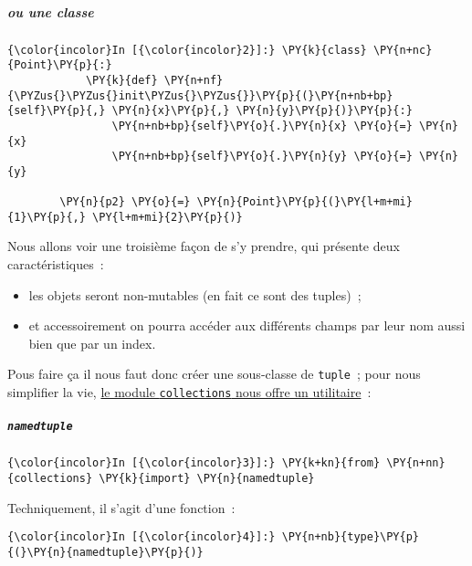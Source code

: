     \hypertarget{ou-une-classe}{%
\subparagraph{ou une classe}\label{ou-une-classe}}

    \begin{Verbatim}[commandchars=\\\{\}]
{\color{incolor}In [{\color{incolor}2}]:} \PY{k}{class} \PY{n+nc}{Point}\PY{p}{:}
            \PY{k}{def} \PY{n+nf}{\PYZus{}\PYZus{}init\PYZus{}\PYZus{}}\PY{p}{(}\PY{n+nb+bp}{self}\PY{p}{,} \PY{n}{x}\PY{p}{,} \PY{n}{y}\PY{p}{)}\PY{p}{:}
                \PY{n+nb+bp}{self}\PY{o}{.}\PY{n}{x} \PY{o}{=} \PY{n}{x}
                \PY{n+nb+bp}{self}\PY{o}{.}\PY{n}{y} \PY{o}{=} \PY{n}{y}
        
        \PY{n}{p2} \PY{o}{=} \PY{n}{Point}\PY{p}{(}\PY{l+m+mi}{1}\PY{p}{,} \PY{l+m+mi}{2}\PY{p}{)}
\end{Verbatim}


    Nous allons voir une troisième façon de s'y prendre, qui présente deux
caractéristiques~:

\begin{itemize}
\tightlist
\item
  les objets seront non-mutables (en fait ce sont des tuples)~;
\item
  et accessoirement on pourra accéder aux différents champs par leur nom
  aussi bien que par un index.
\end{itemize}

    Pous faire ça il nous faut donc créer une sous-classe de
\texttt{tuple}~; pour nous simplifier la vie,
\href{https://docs.python.org/3/library/collections.html\#collections.namedtuple}{le
module \texttt{collections} nous offre un utilitaire}~:

    \hypertarget{namedtuple}{%
\subparagraph{\texorpdfstring{\texttt{namedtuple}}{namedtuple}}\label{namedtuple}}

    \begin{Verbatim}[commandchars=\\\{\}]
{\color{incolor}In [{\color{incolor}3}]:} \PY{k+kn}{from} \PY{n+nn}{collections} \PY{k}{import} \PY{n}{namedtuple}
\end{Verbatim}


    Techniquement, il s'agit d'une fonction~:

    \begin{Verbatim}[commandchars=\\\{\}]
{\color{incolor}In [{\color{incolor}4}]:} \PY{n+nb}{type}\PY{p}{(}\PY{n}{namedtuple}\PY{p}{)}
\end{Verbatim}


